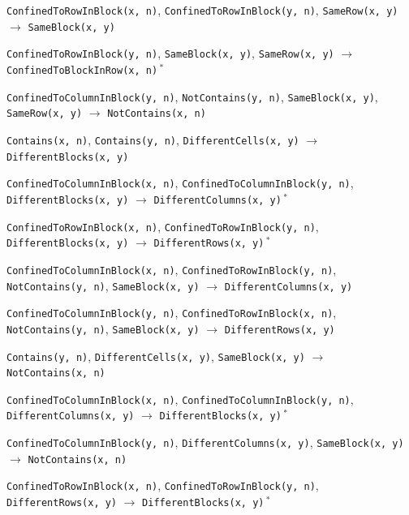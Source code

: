 \documentclass[11pt,a4paper]{article}
\theoremstyle{definition}
\theoremstyle{remark}
\begin{document}
{\begin{enumerate}[label={[\arabic*]},leftmargin=2.6em,itemsep=1pt]
  \item \texttt{ConfinedToRowInBlock(x,~n)}, \allowbreak \texttt{ConfinedToRowInBlock(y,~n)}, \allowbreak \texttt{SameRow(x,~y)} \;$\to$\; \texttt{SameBlock(x,~y)}
  \item \texttt{ConfinedToRowInBlock(y,~n)}, \allowbreak \texttt{SameBlock(x,~y)}, \allowbreak \texttt{SameRow(x,~y)} \;$\to$\; \texttt{ConfinedToBlockInRow(x,~n)}\,$^{\ast}$
  \item \texttt{ConfinedToColumnInBlock(y,~n)}, \allowbreak \texttt{NotContains(y,~n)}, \allowbreak \texttt{SameBlock(x,~y)}, \allowbreak \texttt{SameRow(x,~y)} \;$\to$\; \texttt{NotContains(x,~n)}
  \item \texttt{Contains(x,~n)}, \allowbreak \texttt{Contains(y,~n)}, \allowbreak \texttt{DifferentCells(x,~y)} \;$\to$\; \texttt{DifferentBlocks(x,~y)}
  \item \texttt{ConfinedToColumnInBlock(x,~n)}, \allowbreak \texttt{ConfinedToColumnInBlock(y,~n)}, \allowbreak \texttt{DifferentBlocks(x,~y)} \;$\to$\; \texttt{DifferentColumns(x,~y)}\,$^{\ast}$
  \item \texttt{ConfinedToRowInBlock(x,~n)}, \allowbreak \texttt{ConfinedToRowInBlock(y,~n)}, \allowbreak \texttt{DifferentBlocks(x,~y)} \;$\to$\; \texttt{DifferentRows(x,~y)}\,$^{\ast}$
  \item \texttt{ConfinedToColumnInBlock(x,~n)}, \allowbreak \texttt{ConfinedToRowInBlock(y,~n)}, \allowbreak \texttt{NotContains(y,~n)}, \allowbreak \texttt{SameBlock(x,~y)} \;$\to$\; \texttt{DifferentColumns(x,~y)}
  \item \texttt{ConfinedToColumnInBlock(y,~n)}, \allowbreak \texttt{ConfinedToRowInBlock(x,~n)}, \allowbreak \texttt{NotContains(y,~n)}, \allowbreak \texttt{SameBlock(x,~y)} \;$\to$\; \texttt{DifferentRows(x,~y)}
  \item \texttt{Contains(y,~n)}, \allowbreak \texttt{DifferentCells(x,~y)}, \allowbreak \texttt{SameBlock(x,~y)} \;$\to$\; \texttt{NotContains(x,~n)}
  \item \texttt{ConfinedToColumnInBlock(x,~n)}, \allowbreak \texttt{ConfinedToColumnInBlock(y,~n)}, \allowbreak \texttt{DifferentColumns(x,~y)} \;$\to$\; \texttt{DifferentBlocks(x,~y)}\,$^{\ast}$
  \item \texttt{ConfinedToColumnInBlock(y,~n)}, \allowbreak \texttt{DifferentColumns(x,~y)}, \allowbreak \texttt{SameBlock(x,~y)} \;$\to$\; \texttt{NotContains(x,~n)}
  \item \texttt{ConfinedToRowInBlock(x,~n)}, \allowbreak \texttt{ConfinedToRowInBlock(y,~n)}, \allowbreak \texttt{DifferentRows(x,~y)} \;$\to$\; \texttt{DifferentBlocks(x,~y)}\,$^{\ast}$

\end{enumerate}}
\end{document}
